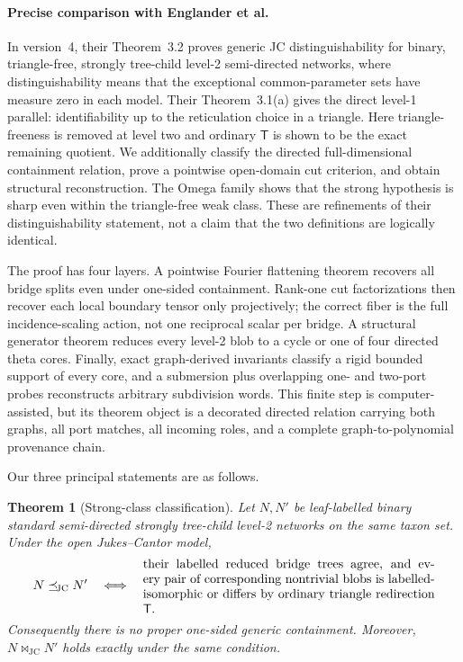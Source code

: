 \documentclass[11pt]{article}
\newtheorem{theorem}{Theorem}[section]
\theoremstyle{remark}
\newcommand{\JC}{\mathrm{JC}}
\newcommand{\Tmove}{\mathsf T}
\newcommand{\preceqjc}{\preceq_{\!\JC}}
\newcommand{\bowtiejc}{\mathbin{\bowtie}_{\!\JC}}
\begin{document}
\paragraph{Precise comparison with Englander et al.}
In version~4, their Theorem~3.2 proves generic JC distinguishability for
binary, triangle-free, strongly tree-child level-2 semi-directed networks,
where distinguishability means that the exceptional common-parameter sets
have measure zero in each model.  Their Theorem~3.1(a) gives the direct
level-1 parallel: identifiability up to the reticulation choice in a triangle.
Here triangle-freeness is removed at level two and ordinary $\Tmove$ is shown
to be the exact remaining quotient.  We additionally classify the directed
full-dimensional containment relation, prove a pointwise open-domain cut
criterion, and obtain structural reconstruction.  The Omega family shows
that the strong hypothesis is sharp even within the triangle-free weak
class.  These are refinements of their distinguishability statement, not a
claim that the two definitions are logically identical.

The proof has four layers.  A pointwise Fourier flattening theorem recovers
all bridge splits even under one-sided containment.  Rank-one cut
factorizations then recover each local boundary tensor only projectively; the
correct fiber is the full incidence-scaling action, not one reciprocal scalar
per bridge.  A structural generator theorem reduces every level-2 blob to a
cycle or one of four directed theta cores.  Finally, exact graph-derived
invariants classify a rigid bounded support of every core, and a submersion
plus overlapping one- and two-port probes reconstructs arbitrary subdivision
words.  This finite step is computer-assisted, but its theorem object is a
decorated directed relation carrying both graphs, all port matches, all
incoming roles, and a complete graph-to-polynomial provenance chain.

Our three principal statements are as follows.

\begin{theorem}[Strong-class classification]\label{thm:main}
Let $N,N'$ be leaf-labelled binary standard semi-directed strongly
tree-child level-2 networks on the same taxon set.  Under the open
Jukes--Cantor model,
\[
N\preceqjc N'
\quad\Longleftrightarrow\quad
\begin{minipage}[c]{.67\linewidth}
their labelled reduced bridge trees agree, and every pair of corresponding
nontrivial blobs is labelled-isomorphic or differs by ordinary triangle
redirection $\Tmove$.
\end{minipage}
\]
Consequently there is no proper one-sided generic containment.  Moreover,
$N\bowtiejc N'$ holds exactly under the same condition.
\end{theorem}
\end{document}
